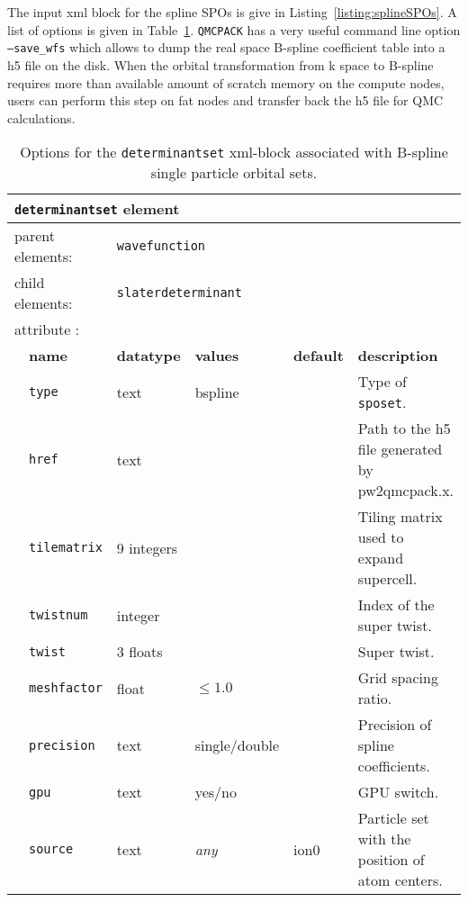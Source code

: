 The input xml block for the spline SPOs is give in Listing~\ref{listing:splineSPOs}. A list of options is given in 
Table~\ref{table:splineSPOs}. \texttt{QMCPACK} has a very useful command line option \texttt{--save\_wfs} which allows to dump 
the real space B-spline coefficient table into a h5 file on the disk.
When the orbital transformation from k space to B-spline requires more than available amount of scratch memory on the compute nodes, 
users can perform this step on fat nodes and transfer back the h5 file for QMC calculations.

\begin{table}[h]
\begin{center}
\begin{tabularx}{\textwidth}{l l l l l l }
\hline
\multicolumn{6}{l}{\texttt{determinantset} element} \\
\hline
\multicolumn{2}{l}{parent elements:} & \multicolumn{4}{l}{\texttt{wavefunction}}\\
\multicolumn{2}{l}{child  elements:} & \multicolumn{4}{l}{\texttt{slaterdeterminant}}\\
\multicolumn{2}{l}{attribute      :} & \multicolumn{4}{l}{}\\
   &   \bfseries name              & \bfseries datatype & \bfseries values & \bfseries default   & \bfseries description \\
   &   \texttt{type}                    &  text               &   bspline   &               &  Type of \texttt{sposet}. \\
   &   \texttt{href}                    &  text               &             &               &  Path to the h5 file generated by pw2qmcpack.x. \\
   &   \texttt{tilematrix}              &  9 integers         &             &               &  Tiling matrix used to expand supercell. \\
   &   \texttt{twistnum}                &  integer            &             &               &  Index of the super twist. \\
   &   \texttt{twist}                   &  3 floats         &             &               &  Super twist. \\
   &   \texttt{meshfactor}              &  float              &  $\le 1.0$      &               &  Grid spacing ratio. \\
   &   \texttt{precision}               &  text               &  single/double  &               &  Precision of spline coefficients. \\
   &   \texttt{gpu}                    &  text               &  yes/no      &               &  GPU switch. \\
   &   \texttt{source}               &  text               &   \textit{any}    &  ion0        & Particle set with the position of atom centers. \\
  \hline
\end{tabularx}
\end{center}
\caption{Options for the \texttt{determinantset} xml-block associated with B-spline single particle orbital sets.}
\label{table:splineSPOs}
\end{table}

